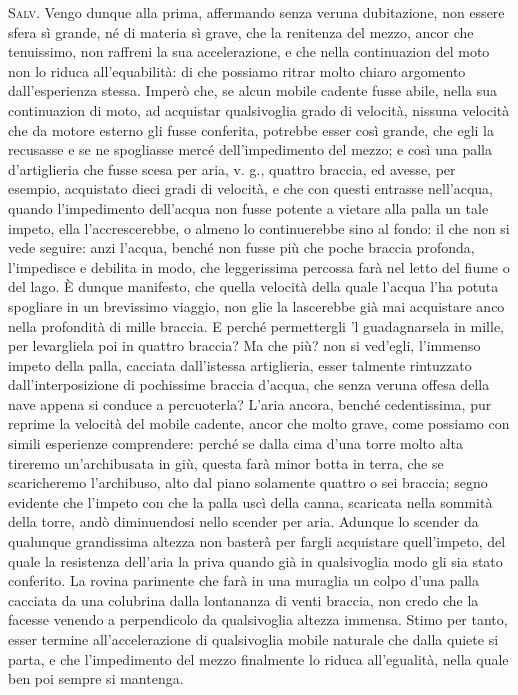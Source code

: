 \documentclass[11pt,twoside,openany]{book}
\newcommand{\speaker}[1]{\textcolor{rubric}{\textsc{#1}}\space}
\begin{document}
\speaker{Salv.} Vengo dunque alla prima, affermando senza veruna dubitazione, non essere sfera sì grande, né di materia sì grave, che la renitenza del mezzo, ancor che tenuissimo, non raffreni la sua accelerazione, e che nella continuazion del moto non lo riduca all'equabilità: di che possiamo ritrar molto chiaro argomento dall'esperienza stessa. Imperò che, se alcun mobile cadente fusse abile, nella sua continuazion di moto, ad acquistar qualsivoglia grado di velocità, nissuna velocità che da motore esterno gli fusse conferita, potrebbe esser così grande, che egli la recusasse e se ne spogliasse mercé dell'impedimento del mezzo; e così una palla d'artiglieria che fusse scesa per aria, v. g., quattro braccia, ed avesse, per esempio, acquistato dieci gradi di velocità, e che con questi entrasse nell'acqua, quando l'impedimento dell'acqua non fusse potente a vietare alla palla un tale impeto, ella l'accrescerebbe, o almeno lo continuerebbe sino al fondo: il che non si vede seguire: anzi l'acqua, benché non fusse più che poche braccia profonda, l'impedisce e debilita in modo, che leggerissima percossa farà nel letto del fiume o del lago. È dunque manifesto, che quella velocità della quale l'acqua l'ha potuta spogliare in un brevissimo viaggio, non glie la lascerebbe già mai acquistare anco nella profondità di mille braccia. E perché permettergli 'l guadagnarsela in mille, per levargliela poi in quattro braccia? Ma che più? non si ved'egli, l'immenso impeto della palla, cacciata dall'istessa artiglieria, esser talmente rintuzzato dall'interposizione di pochissime braccia d'acqua, che senza veruna offesa della nave appena si conduce a percuoterla? L'aria ancora, benché cedentissima, pur reprime la velocità del mobile cadente, ancor che molto grave, come possiamo con simili esperienze comprendere: perché se dalla cima d'una torre molto alta tireremo un'archibusata in giù, questa farà minor botta in terra, che se scaricheremo l'archibuso, alto dal piano solamente quattro o sei braccia; segno evidente che l'impeto con che la palla uscì della canna, scaricata nella sommità della torre, andò diminuendosi nello scender per aria. Adunque lo scender da qualunque grandissima altezza non basterà per fargli acquistare quell'impeto, del quale la resistenza dell'aria la priva quando già in qualsivoglia modo gli sia stato conferito. La rovina parimente che farà in una muraglia un colpo d'una palla cacciata da una colubrina dalla lontananza di venti braccia, non credo che la facesse venendo a perpendicolo da qualsivoglia altezza immensa. Stimo per tanto, esser termine all'accelerazione di qualsivoglia mobile naturale che dalla quiete si parta, e che l'impedimento del mezzo finalmente lo riduca all'egualità, nella quale ben poi sempre si mantenga.
\end{document}

